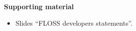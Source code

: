 \documentclass[a4paper]{article}
\begin{document}
\textbf{Supporting material}

\begin{itemize}
\item Slides ``FLOSS developers statements''.
\end{itemize}

% 
% 
% 
% 
% 
% 
% 
% 
% 
% 
% 
\end{document}
